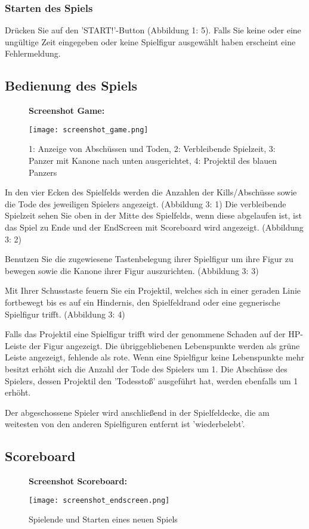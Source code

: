 \documentclass[a4paper]{article}
\begin{document}
\subsubsection{Starten des Spiels}
Drücken Sie auf den 'START!'-Button (Abbildung 1: 5). Falls Sie keine oder eine ungültige Zeit eingegeben oder keine Spielfigur ausgewählt haben erscheint eine Fehlermeldung.

\newpage
\subsection{Bedienung des Spiels}
\begin{figure}[H]
  \textbf{Screenshot Game:}\par\medskip
  \centering
\texttt{[image: screenshot\_game.png]}    \caption{1: Anzeige von Abschüssen und Toden, 2: Verbleibende Spielzeit, 3: Panzer mit Kanone nach unten ausgerichtet, 4: Projektil des blauen Panzers}
\end{figure}



In den vier Ecken des Spielfelds werden die Anzahlen der Kills/Abschüsse sowie die Tode des jeweiligen Spielers angezeigt. (Abbildung 3: 1)
Die verbleibende Spielzeit sehen Sie oben in der Mitte des Spielfelds, wenn diese abgelaufen ist, ist das Spiel zu Ende und der EndScreen mit Scoreboard wird angezeigt. (Abbildung 3: 2)

Benutzen Sie die zugewiesene Tastenbelegung ihrer Spielfigur um ihre Figur zu bewegen sowie die Kanone ihrer Figur auszurichten. (Abbildung 3: 3) 

Mit Ihrer Schusstaste feuern Sie ein Projektil, welches sich in einer geraden Linie fortbewegt bis es auf ein Hindernis, den Spielfeldrand oder eine gegnerische Spielfigur trifft. (Abbildung 3: 4)

Falls das Projektil eine Spielfigur trifft wird der genommene Schaden auf der HP-Leiste der Figur angezeigt. Die übriggebliebenen Lebenspunkte werden als grüne Leiste angezeigt, fehlende als rote.
Wenn eine Spielfigur keine Lebenspunkte mehr besitzt erhöht sich die Anzahl der Tode des Spielers um 1. Die Abschüsse des Spielers, dessen Projektil den 'Todesstoß' ausgeführt hat, werden ebenfalls um 1 erhöht.

Der abgeschossene Spieler wird anschließend in der Spielfeldecke, die am weitesten von den anderen Spielfiguren entfernt ist 'wiederbelebt'.

\newpage
\subsection{Scoreboard}
\begin{figure}[H]
  \textbf{Screenshot Scoreboard:}\par\medskip
  \centering
\texttt{[image: screenshot\_endscreen.png]}    
\caption{Spielende und Starten eines neuen Spiels}
\end{figure}
\end{document}
